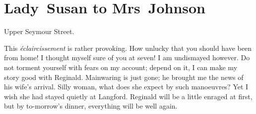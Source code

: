 \chapter{Lady~Susan to Mrs~Johnson}
  
  \vfill
  \begin{mail}{Upper Seymour Street.}{}

This \textit{éclaircissement} is rather provoking. How unlucky that you should have been from home! I thought myself sure of you at seven! I am undismayed however. Do not torment yourself with fears on my account; depend on it, I can make my story good with Reginald. Mainwaring is just gone; he brought me the news of his wife's arrival. Silly woman, what does she expect by such manoeuvres? Yet I wish she had stayed quietly at Langford. Reginald will be a little enraged at first, but by to-morrow's dinner, everything will be well again. 

\end{mail}
\vfill